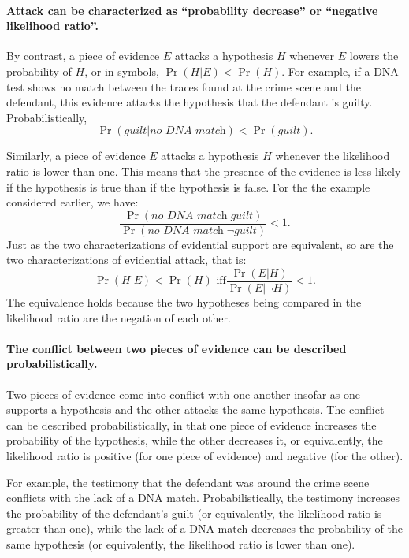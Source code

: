 \documentclass[10pt]{article}
\begin{document}
 
\paragraph{Attack can be characterized as ``probability decrease'' or ``negative likelihood ratio''.} 

By contrast, a piece of evidence $E$ attacks a hypothesis $H$ whenever $E$ lowers 
the probability of $H$, or in symbols, $\Pr(H|E) < \Pr(H)$.
For example, if a DNA test shows no match between the traces found at the crime
 scene and the defendant, this evidence attacks the hypothesis that the defendant is guilty. 
 Probabilistically, 
%
\[ \Pr(\textit{guilt}|\textit{no DNA match}) < \Pr(\textit{guilt}).\] 
%

\noindent Similarly, a piece of evidence $E$ attacks a hypothesis $H$ whenever 
the likelihood ratio is lower than one. This means that the presence of the evidence is less likely %
if the hypothesis is true than if the hypothesis is false. For the the example 
considered earlier, we have:
 \[\frac{\Pr(\textit{no DNA match}|\textit{guilt})}{\Pr(\textit{no DNA match}|\neg \textit{guilt})} < 1.\]
%
Just as the two characterizations 
of evidential support are equivalent, so are the two characterizations of evidential attack, 
that is:
\[ \Pr(H|E) < \Pr(H) \text{ iff} \frac{\Pr(E|H)}{\Pr(E|\neg H)} < 1.\]
%
The equivalence holds because the two hypotheses 
being compared in the likelihood ratio are 
the negation of each other.

\paragraph{The conflict between two pieces of evidence can be described probabilistically.}
Two pieces of evidence come into 
conflict with one another insofar as one supports a hypothesis 
and the other attacks the same hypothesis. 
The conflict can be described probabilistically, in that one piece of evidence increases 
the probability of the hypothesis, while the other decreases it, or equivalently, the likelihood ratio is positive (for one piece 
of evidence) and negative (for the other). 

For example, the testimony that the defendant was around the crime scene conflicts 
with the lack of a DNA match. Probabilistically, the testimony 
increases the probability of the defendant's guilt (or equivalently, the likelihood ratio is greater than one),
while the lack of a DNA match decreases the probability of the same hypothesis 
(or equivalently, the likelihood ratio is lower than one).
\end{document}
